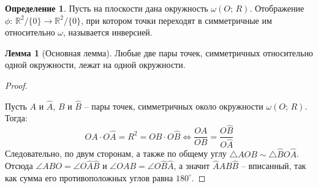 \documentclass[12pt]{article}
\theoremstyle{definition}
\newtheorem{lemma}[theorem]{Лемма}
\newtheorem{definition}{Определение}
\newcommand{\R}{\mathbb{R}}
\begin{document}
    \begin{definition}
        Пусть на плоскости дана окружность $\omega(O;\,R)$. Отображение $\phi:\,\R^2/\{0\}\longrightarrow \R^2/\{0\}$, при котором точки переходят в симметричные им относительно $\omega$, называется инверсией.
    \end{definition}
    \begin{lemma}[Основная лемма]
        Любые две пары точек, симметричных относительно одной окружности, лежат на одной окружности.
    \end{lemma}
    \begin{proof}
        $ $\newline
        \begin{center}
        \end{center}
        Пусть $A$ и $\widehat{A}$, $B$ и $\widehat{B}$ -- пары точек, симметричных около окружности $\omega(O;\,R)$. Тогда:
        $$OA\cdot O\widehat{A}=R^2=OB\cdot O\widehat{B}\Longleftrightarrow \frac{OA}{OB}=\frac{O\widehat{B}}{O\widehat{A}}$$
        Следовательно, по двум сторонам, а также по общему углу $\triangle AOB \sim \triangle \widehat{B}O\widehat{A}$. Отсюда $\angle ABO=\angle O\widehat{A}\widehat{B}$ и $\angle OAB=\angle O\widehat{B}\widehat{A}$, а значит $\widehat{A}AB\widehat{B}$ -- вписанный, так как сумма его противоположных углов равна $180^{\circ}$.
    \end{proof}
\end{document}
